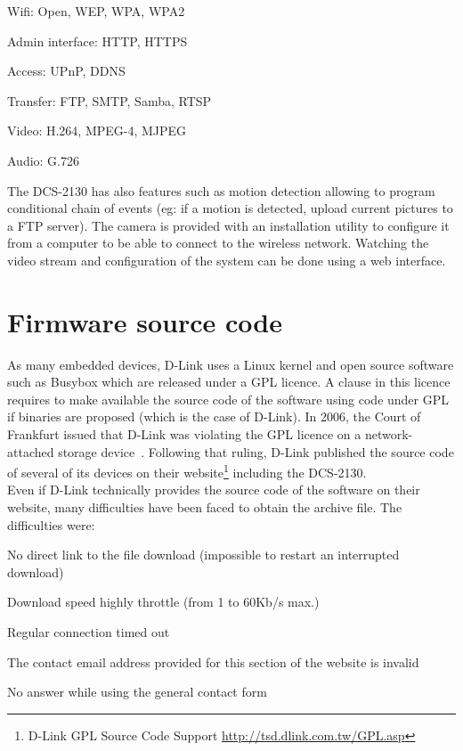\begin{itemizealt}
\item Wifi: Open, WEP, WPA, WPA2
\item Admin interface: HTTP, HTTPS
\item Access: UPnP, DDNS
\item Transfer: FTP, SMTP, Samba, RTSP
\item Video: H.264, MPEG-4, MJPEG
\item Audio: G.726
\end{itemizealt}

The DCS-2130 has also features such as motion detection allowing to program conditional chain of events (eg: if a motion is detected, upload current pictures to a FTP server).
The camera is provided with an installation utility to configure it from a computer to be able to connect to the wireless network.
Watching the video stream and configuration of the system can be done using a web interface.

\section{Firmware source code}
\label{sec:dcs-gpl}

As many embedded devices, D-Link uses a Linux kernel and open source software such as Busybox which are released under a GPL licence.
A clause in this licence requires to make available the source code of the software using code under GPL if binaries are proposed (which is the case of D-Link).
In 2006, the Court of Frankfurt issued that D-Link was violating the GPL licence on a network-attached storage device~\cite{dlink-gpl-viol}.
Following that ruling, D-Link published the source code of several of its devices on their website\footnote{D-Link GPL Source Code Support \url{http://tsd.dlink.com.tw/GPL.asp}} including the DCS-2130.\\

Even if D-Link technically provides the source code of the software on their website, many difficulties have been faced to obtain the archive file.
The difficulties were:

\begin{itemizealt}
\item No direct link to the file download (impossible to restart an interrupted download)
\item Download speed highly throttle (from 1 to 60Kb/s max.)
\item Regular connection timed out
\item The contact email address provided for this section of the website is invalid
\item No answer while using the general contact form
\end{itemizealt}

